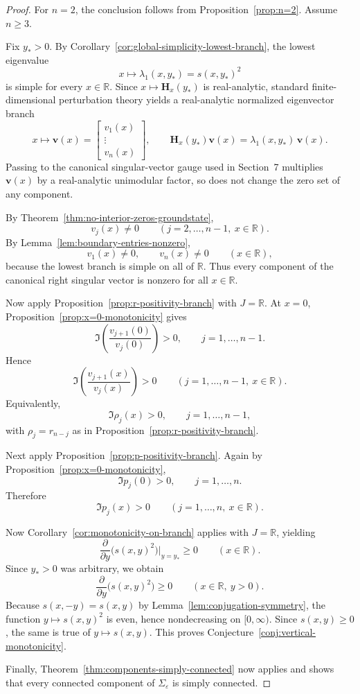 \documentclass[11pt]{article}
\begin{document}
\begin{proof}
For \(n=2\), the conclusion follows from Proposition~\ref{prop:n=2}. Assume \(n\ge 3\).

Fix \(y_*>0\). By Corollary~\ref{cor:global-simplicity-lowest-branch}, the lowest eigenvalue
\[
x\longmapsto \lambda_1(x,y_*)=s(x,y_*)^2
\]
is simple for every \(x\in\mathbb R\). Since \(x\mapsto \mathbf H_x(y_*)\) is real-analytic, standard
finite-dimensional perturbation theory yields a real-analytic normalized eigenvector branch
\[
x\longmapsto \mathbf v(x)=
\begin{bmatrix}
v_1(x)\\ \vdots\\ v_n(x)
\end{bmatrix},
\qquad
\mathbf H_x(y_*)\mathbf v(x)=\lambda_1(x,y_*)\,\mathbf v(x).
\]
Passing to the canonical singular-vector gauge used in Section~7 multiplies \(\mathbf v(x)\) by a
real-analytic unimodular factor, so does not change the zero set of any component.

By Theorem~\ref{thm:no-interior-zeros-groundstate},
\[
v_j(x)\neq 0
\qquad
(j=2,\dots,n-1,\ x\in\mathbb R).
\]
By Lemma~\ref{lem:boundary-entries-nonzero},
\[
v_1(x)\neq 0,
\qquad
v_n(x)\neq 0
\qquad
(x\in\mathbb R),
\]
because the lowest branch is simple on all of \(\mathbb R\). Thus every component of the canonical
right singular vector is nonzero for all \(x\in\mathbb R\).

Now apply Proposition~\ref{prop:r-positivity-branch} with \(J=\mathbb R\). At \(x=0\),
Proposition~\ref{prop:x=0-monotonicity} gives
\[
\Im\!\left(\frac{v_{j+1}(0)}{v_j(0)}\right)>0,
\qquad
j=1,\dots,n-1.
\]
Hence
\[
\Im\!\left(\frac{v_{j+1}(x)}{v_j(x)}\right)>0
\qquad
(j=1,\dots,n-1,\ x\in\mathbb R).
\]
Equivalently,
\[
\Im \rho_j(x)>0,
\qquad
j=1,\dots,n-1,
\]
with \(\rho_j=r_{n-j}\) as in Proposition~\ref{prop:r-positivity-branch}.

Next apply Proposition~\ref{prop:p-positivity-branch}. Again by Proposition~\ref{prop:x=0-monotonicity},
\[
\Im p_j(0)>0,
\qquad
j=1,\dots,n.
\]
Therefore
\[
\Im p_j(x)>0
\qquad
(j=1,\dots,n,\ x\in\mathbb R).
\]

Now Corollary~\ref{cor:monotonicity-on-branch} applies with \(J=\mathbb R\), yielding
\[
\frac{\partial}{\partial y}\bigl(s(x,y)^2\bigr)\Big|_{y=y_*}\ge 0
\qquad
(x\in\mathbb R).
\]
Since \(y_*>0\) was arbitrary, we obtain
\[
\frac{\partial}{\partial y}\bigl(s(x,y)^2\bigr)\ge 0
\qquad
(x\in\mathbb R,\ y>0).
\]
Because \(s(x,-y)=s(x,y)\) by Lemma~\ref{lem:conjugation-symmetry}, the function
\(y\mapsto s(x,y)^2\) is even, hence nondecreasing on \([0,\infty)\). Since \(s(x,y)\ge 0\),
the same is true of \(y\mapsto s(x,y)\). This proves Conjecture~\ref{conj:vertical-monotonicity}.

Finally, Theorem~\ref{thm:components-simply-connected} now applies and shows that every connected
component of \(\Sigma_\varepsilon\) is simply connected.
\end{proof}
\end{document}
